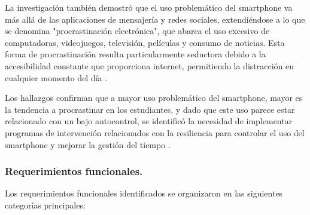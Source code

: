 La investigación también demostró que el uso problemático del smartphone va más allá de las aplicaciones de mensajería y redes sociales, extendiéndose a lo que se denomina "procrastinación electrónica", que abarca el uso excesivo de computadoras, videojuegos, televisión, películas y consumo de noticias. Esta forma de procrastinación resulta particularmente seductora debido a la accesibilidad constante que proporciona internet, permitiendo la distracción en cualquier momento del día \cite{Sociedad2023}.

Los hallazgos confirman que a mayor uso problemático del smartphone, mayor es la tendencia a procrastinar en los estudiantes, y dado que este uso parece estar relacionado con un bajo autocontrol, se identificó la necesidad de implementar programas de intervención relacionados con la resiliencia para controlar el uso del smartphone y mejorar la gestión del tiempo \cite{Santillan2020}.

\subsubsection{Requerimientos funcionales.}

Los requerimientos funcionales identificados se organizaron en las siguientes categorías principales:

